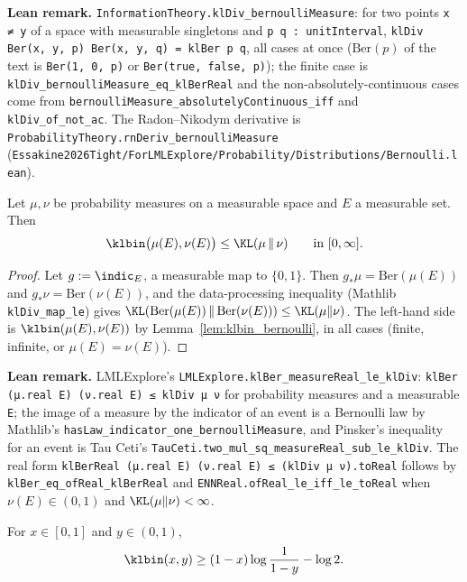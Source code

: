 \textbf{Lean remark.} \texttt{InformationTheory.klDiv\_bernoulliMeasure}: for two points
\texttt{x ≠ y} of a space with measurable singletons and \texttt{p q : unitInterval},
\texttt{klDiv Ber(x, y, p) Ber(x, y, q) = klBer p q}, all cases at once ($\mathrm{Ber}(p)$ of the
text is \texttt{Ber(1, 0, p)} or \texttt{Ber(true, false, p)}); the finite case is
\texttt{klDiv\_bernoulliMeasure\_eq\_klBerReal} and the non-absolutely-continuous cases come from
\texttt{bernoulliMeasure\_absolutelyContinuous\_iff} and \texttt{klDiv\_of\_not\_ac}. The
Radon--Nikodym derivative is \texttt{ProbabilityTheory.rnDeriv\_bernoulliMeasure}
(\texttt{Essakine2026Tight/ForLMLExplore/Probability/Distributions/Bernoulli.lean}).

\begin{lemma}\label{lem:klbin_le_kl}
\leanok
{}
Let $\mu, \nu$ be probability measures on a measurable space and $E$ a measurable set. Then
\[
  \klbin\big(\mu(E), \nu(E)\big) \le \KL(\mu \,\|\, \nu) \qquad\text{in } [0, \infty].
\]
\end{lemma}

\begin{proof}
\leanok
Let $g := \indic_E$, a measurable map to $\{0, 1\}$. Then $g_*\mu = \mathrm{Ber}(\mu(E))$ and
$g_*\nu = \mathrm{Ber}(\nu(E))$, and the data-processing inequality (Mathlib
\texttt{klDiv\_map\_le}) gives $\KL(\mathrm{Ber}(\mu(E))\,\|\,\mathrm{Ber}(\nu(E))) \le \KL(\mu\|\nu)$.
The left-hand side is $\klbin(\mu(E), \nu(E))$ by Lemma~\ref{lem:klbin_bernoulli}, in all cases
(finite, infinite, or $\mu(E) = \nu(E)$).
\end{proof}

\textbf{Lean remark.} LMLExplore's \texttt{LMLExplore.klBer\_measureReal\_le\_klDiv}:
\texttt{klBer (μ.real E) (ν.real E) ≤ klDiv μ ν} for probability measures and a measurable
\texttt{E}; the image of a measure by the indicator of an event is a Bernoulli law by Mathlib's
\texttt{hasLaw\_indicator\_one\_bernoulliMeasure}, and Pinsker's inequality for an event is Tau Ceti's
\texttt{TauCeti.two\_mul\_sq\_measureReal\_sub\_le\_klDiv}. The real form
\texttt{klBerReal (μ.real E) (ν.real E) ≤ (klDiv μ ν).toReal} follows by
\texttt{klBer\_eq\_ofReal\_klBerReal} and \texttt{ENNReal.ofReal\_le\_iff\_le\_toReal} when
$\nu(E) \in (0,1)$ and $\KL(\mu\|\nu) < \infty$.

\begin{lemma}\label{lem:klbin_lower}
\leanok
{}
For $x \in [0, 1]$ and $y \in (0, 1)$,
\[
  \klbin(x, y) \ge (1 - x)\log\frac{1}{1 - y} - \log 2 .
\]
\end{lemma}

